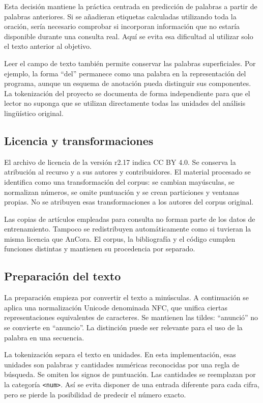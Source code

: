 Esta decisión mantiene la práctica centrada en predicción de palabras a partir de palabras anteriores. Si se añadieran etiquetas calculadas utilizando toda la oración, sería necesario comprobar si incorporan información que no estaría disponible durante una consulta real. Aquí se evita esa dificultad al utilizar solo el texto anterior al objetivo.

Leer el campo de texto también permite conservar las palabras superficiales. Por ejemplo, la forma ``del'' permanece como una palabra en la representación del programa, aunque un esquema de anotación pueda distinguir sus componentes. La tokenización del proyecto se documenta de forma independiente para que el lector no suponga que se utilizan directamente todas las unidades del análisis lingüístico original.

\subsection{Licencia y transformaciones}
El archivo de licencia de la versión r2.17 indica CC BY 4.0. Se conserva la atribución al recurso y a sus autores y contribuidores. El material procesado se identifica como una transformación del corpus: se cambian mayúsculas, se normalizan números, se omite puntuación y se crean particiones y ventanas propias. No se atribuyen esas transformaciones a los autores del corpus original.

Las copias de artículos empleadas para consulta no forman parte de los datos de entrenamiento. Tampoco se redistribuyen automáticamente como si tuvieran la misma licencia que AnCora. El corpus, la bibliografía y el código cumplen funciones distintas y mantienen su procedencia por separado.

\subsection{Preparación del texto}
La preparación empieza por convertir el texto a minúsculas. A continuación se aplica una normalización Unicode denominada NFC, que unifica ciertas representaciones equivalentes de caracteres. Se mantienen las tildes: ``anunció'' no se convierte en ``anuncio''. La distinción puede ser relevante para el uso de la palabra en una secuencia.

La tokenización separa el texto en unidades. En esta implementación, esas unidades son palabras y cantidades numéricas reconocidas por una regla de búsqueda. Se omiten los signos de puntuación. Las cantidades se reemplazan por la categoría \texttt{<num>}. Así se evita disponer de una entrada diferente para cada cifra, pero se pierde la posibilidad de predecir el número exacto.

